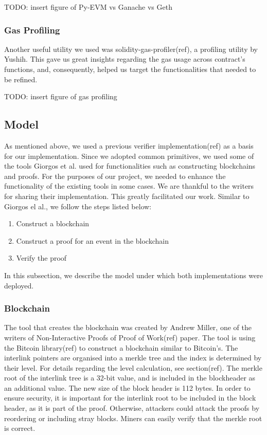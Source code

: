 \documentclass{article}
\begin{document}
  TODO: insert figure of Py-EVM vs Ganache vs Geth

  \subsubsection{Gas Profiling}

  Another useful utility we used was solidity-gas-profiler(ref), a
  profiling utility by Yushih. This gave us great insights regarding the
  gas usage across contract’s functions, and, consequently, helped us
  target the functionalities that needed to be refined.

  TODO: insert figure of gas profiling

  \subsection{Model}

  As mentioned above, we used a previous verifier implementation(ref) as
  a basis for our implementation. Since we adopted common primitives, we
  used some of the tools Giorgos et al. used for functionalities such as
  constructing blockchains and proofs. For the purposes of our project,
  we needed to enhance the functionality of the existing tools in some
  cases. We are thankful to the writers for sharing their
  implementation. This greatly facilitated our work. Similar to Giorgos
  el al., we follow the steps listed below:

  \begin{enumerate}
  \item
    Construct a blockchain
  \item
    Construct a proof for an event in the blockchain
  \item
    Verify the proof
  \end{enumerate}

  In this subsection, we describe the model under which both
  implementations were deployed.

  \subsubsection{Blockchain}

  The tool that creates the blockchain was created by Andrew Miller, one
  of the writers of Non-Interactive Proofs of Proof of Work(ref) paper.
  The tool is using the Bitcoin library(ref) to construct a blockchain
  similar to Bitcoin’s. The interlink pointers are organised into a
  merkle tree and the index is determined by their level. For details
  regarding the level calculation, see section(ref). The merkle root of
  the interlink tree is a 32-bit value, and is included in the
  blockheader as an additional value. The new size of the block header
  is 112 bytes. In order to ensure security, it is important for the
  interlink root to be included in the block header, as it is part of
  the proof. Otherwise, attackers could attack the proofs by reordering
  or including stray blocks. Miners can easily verify that the merkle
  root is correct.
\end{document}
